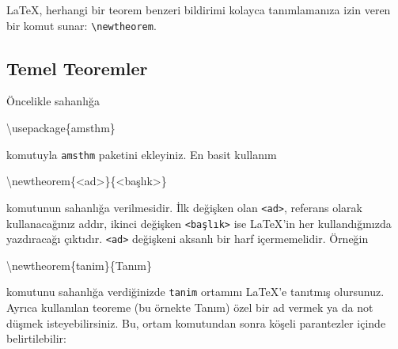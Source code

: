 \documentclass[
  letterpaper,
  DIV=11,
  numbers=noendperiod]{scrreprt}
\newenvironment{Shaded}{\begin{snugshade}}{\end{snugshade}}
\newcommand{\BuiltInTok}[1]{\textcolor[rgb]{0.00,0.23,0.31}{#1}}
\newcommand{\ExtensionTok}[1]{\textcolor[rgb]{0.00,0.23,0.31}{#1}}
\newcommand{\FunctionTok}[1]{\textcolor[rgb]{0.28,0.35,0.67}{#1}}
\newcommand{\NormalTok}[1]{\textcolor[rgb]{0.00,0.23,0.31}{#1}}
\begin{document}
{\LaTeX}, herhangi bir teorem benzeri bildirimi kolayca tanımlamanıza
izin veren bir komut sunar: \texttt{\textbackslash{}newtheorem}.

\hypertarget{temel-teoremler}{%
\subsection{Temel Teoremler}\label{temel-teoremler}}

Öncelikle sahanlığa

\begin{Shaded}
\begin{Highlighting}[]
\BuiltInTok{\textbackslash{}usepackage}\NormalTok{\{}\ExtensionTok{amsthm}\NormalTok{\}}
\end{Highlighting}
\end{Shaded}

komutuyla \texttt{amsthm} paketini ekleyiniz. En basit kullanım

\begin{Shaded}
\begin{Highlighting}[]
\FunctionTok{\textbackslash{}newtheorem}\NormalTok{\{\textless{}ad\textgreater{}\}\{\textless{}başlık\textgreater{}\}}
\end{Highlighting}
\end{Shaded}

komutunun sahanlığa verilmesidir. İlk değişken olan
\texttt{\textless{}ad\textgreater{}}, referans olarak kullanacağınız
addır, ikinci değişken \texttt{\textless{}başlık\textgreater{}} ise
{\LaTeX}'in her kullandığınızda yazdıracağı çıktıdır.
\texttt{\textless{}ad\textgreater{}} değişkeni aksanlı bir harf
içermemelidir. Örneğin

\begin{Shaded}
\begin{Highlighting}[]
\FunctionTok{\textbackslash{}newtheorem}\NormalTok{\{tanim\}\{Tanım\}}
\end{Highlighting}
\end{Shaded}

komutunu sahanlığa verdiğinizde \texttt{tanim} ortamını {\LaTeX}'e
tanıtmış olursunuz. Ayrıca kullanılan teoreme (bu örnekte Tanım) özel
bir ad vermek ya da not düşmek isteyebilirsiniz. Bu, ortam komutundan
sonra köşeli parantezler içinde belirtilebilir:
\end{document}
